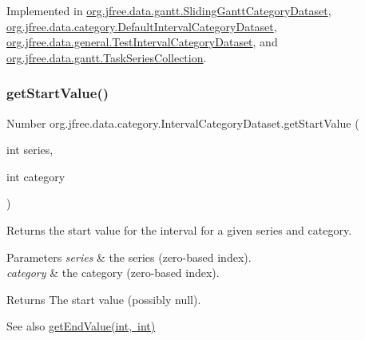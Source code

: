 Implemented in \mbox{\hyperlink{classorg_1_1jfree_1_1data_1_1gantt_1_1_sliding_gantt_category_dataset_ad3151981161728bc2ac87c499a8c1ea6}{org.\+jfree.\+data.\+gantt.\+Sliding\+Gantt\+Category\+Dataset}}, \mbox{\hyperlink{classorg_1_1jfree_1_1data_1_1category_1_1_default_interval_category_dataset_a6b536be218d6a7cafe97ef2d26c85c38}{org.\+jfree.\+data.\+category.\+Default\+Interval\+Category\+Dataset}}, \mbox{\hyperlink{classorg_1_1jfree_1_1data_1_1general_1_1_test_interval_category_dataset_a595f5ee7d09a4215b9e0b006161894c9}{org.\+jfree.\+data.\+general.\+Test\+Interval\+Category\+Dataset}}, and \mbox{\hyperlink{classorg_1_1jfree_1_1data_1_1gantt_1_1_task_series_collection_a93e90606e5261c2fa4ba8a1026f78a1e}{org.\+jfree.\+data.\+gantt.\+Task\+Series\+Collection}}.

\mbox{\label{interfaceorg_1_1jfree_1_1data_1_1category_1_1_interval_category_dataset_ab39752773cf77a5ccbbae7851fd16aa6}} 
\subsubsection{\texorpdfstring{get\+Start\+Value()}{getStartValue()}\hspace{0.1cm}{\footnotesize\ttfamily [1/2]}}
{\footnotesize\ttfamily Number org.\+jfree.\+data.\+category.\+Interval\+Category\+Dataset.\+get\+Start\+Value (\begin{DoxyParamCaption}\item[{int}]{series,  }\item[{int}]{category }\end{DoxyParamCaption})}

Returns the start value for the interval for a given series and category.


\begin{DoxyParams}{Parameters}
{\em series} & the series (zero-\/based index). \\
\hline
{\em category} & the category (zero-\/based index).\\
\hline
\end{DoxyParams}
\begin{DoxyReturn}{Returns}
The start value (possibly {\ttfamily null}).
\end{DoxyReturn}
\begin{DoxySeeAlso}{See also}
\mbox{\hyperlink{interfaceorg_1_1jfree_1_1data_1_1category_1_1_interval_category_dataset_af83cb9f655ea175391fed773b2e478cb}{get\+End\+Value(int, int)}} 
\end{DoxySeeAlso}


